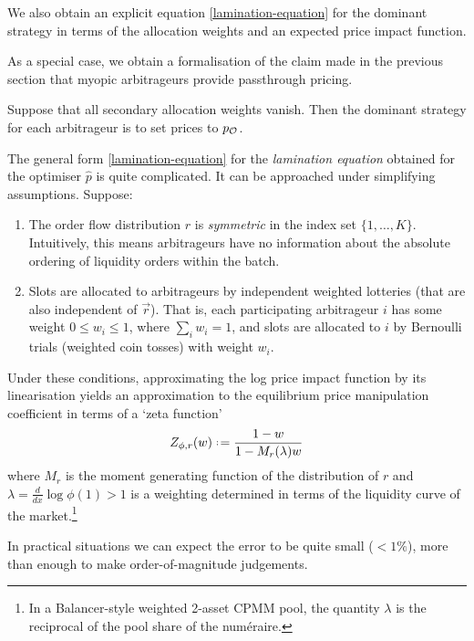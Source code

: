 We also obtain an explicit equation \eqref{lamination-equation} for the dominant strategy in terms of the allocation weights and an expected price impact function.

As a special case, we obtain a formalisation of the claim made in the previous section that myopic arbitrageurs provide passthrough pricing.

\begin{corollary} 

  Suppose that all secondary allocation weights vanish.
  Then the dominant strategy for each arbitrageur is to set prices to $p_{\mathcal{O}}$.

\end{corollary}

The general form \eqref{lamination-equation} for the \emph{lamination equation} obtained for the optimiser $\hat{p}$ is quite complicated.
%
It can be approached under simplifying assumptions. Suppose:
\begin{enumerate}
  \item 
    The order flow distribution $r$ is \emph{symmetric} in the index set $\{1,\ldots,K\}$. 
    Intuitively, this means arbitrageurs have no information about the absolute ordering of liquidity orders within the batch.
  \item 
    Slots are allocated to arbitrageurs by independent weighted lotteries (that are also independent of $\vec{r}$).
    That is, each participating arbitrageur $i$ has some weight $0\leq w_i\leq 1$, where $\sum_iw_i=1$, and slots are allocated to $i$ by Bernoulli trials (weighted coin tosses) with weight $w_i$.
\end{enumerate}
%
Under these conditions, approximating the log price impact function by its linearisation yields an approximation to the equilibrium price manipulation coefficient in terms of a `zeta function'
\[
  Z_{\phi,r}(w)\defeq \frac{1-w}{1-M_r(\lambda)w}
\]
where $M_r$ is the moment generating function of the distribution of $r$ and $\lambda=\frac{d}{dx}\log\phi(1) > 1$ is a weighting determined in terms of the liquidity curve of the market.\footnote{In a Balancer-style weighted 2-asset CPMM pool, the quantity $\lambda$ is the reciprocal of the pool share of the num\'eraire.}

\begin{remark}
  In practical situations we can expect the error to be quite small ($<1\%$), more than enough to make order-of-magnitude judgements.
\end{remark}

